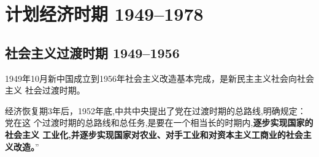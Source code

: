 \chapter{计划经济时期 1949--1978}

\section{社会主义过渡时期 1949--1956}
\label{sec:hongguodu}

1949年10月新中国成立到1956年社会主义改造基本完成，是新民主主义社会向社会主义
社会过渡时期。

经济恢复期3年后，1952年底,中共中央提出了党在过渡时期的总路线,明确规定：党在这
个过渡时期的总路线和总任务,是要在一个相当长的时期内,\textbf{逐步实现国家的社会主义
  工业化,并逐步实现国家对农业、对手工业和对资本主义工商业的社会主义改造。}”

